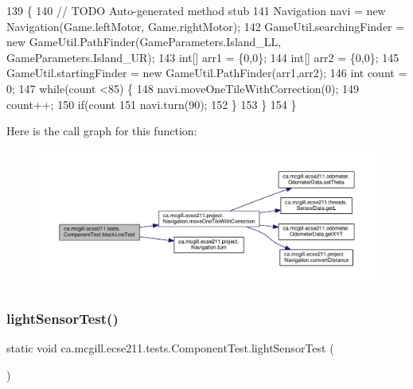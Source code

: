 \begin{DoxyCode}
139                                                                \{
140     \textcolor{comment}{// TODO Auto-generated method stub}
141     Navigation navi = \textcolor{keyword}{new} Navigation(Game.leftMotor, Game.rightMotor);
142     GameUtil.searchingFinder = \textcolor{keyword}{new} GameUtil.PathFinder(GameParameters.Island\_LL, GameParameters.Island\_UR);
143     \textcolor{keywordtype}{int}[] arr1 = \{0,0\};
144     \textcolor{keywordtype}{int}[] arr2 = \{0,0\};
145     GameUtil.startingFinder = \textcolor{keyword}{new} GameUtil.PathFinder(arr1,arr2);
146     \textcolor{keywordtype}{int} count = 0;
147    \textcolor{keywordflow}{while}(count <85) \{
148      navi.moveOneTileWithCorrection(0);
149      count++;
150      \textcolor{keywordflow}{if}(count%
151        navi.turn(90);
152      \}
153    \}
154   \}
\end{DoxyCode}
Here is the call graph for this function\+:
\nopagebreak
\begin{figure}[H]
\begin{center}
\leavevmode
\includegraphics[width=350pt]{enumca_1_1mcgill_1_1ecse211_1_1tests_1_1_component_test_a3f36cee9ca567c845377bec33554ba8b_cgraph}
\end{center}
\end{figure}
\mbox{\label{enumca_1_1mcgill_1_1ecse211_1_1tests_1_1_component_test_a3e8288f482b3806a0f3c4668951f3e36}} 
\subsubsection{\texorpdfstring{light\+Sensor\+Test()}{lightSensorTest()}}
{\footnotesize\ttfamily static void ca.\+mcgill.\+ecse211.\+tests.\+Component\+Test.\+light\+Sensor\+Test (\begin{DoxyParamCaption}{ }\end{DoxyParamCaption})\hspace{0.3cm}{\ttfamily [static]}}

